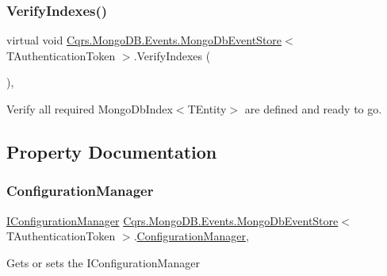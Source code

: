 \subsubsection{\texorpdfstring{Verify\+Indexes()}{VerifyIndexes()}}
{\footnotesize\ttfamily virtual void \hyperlink{classCqrs_1_1MongoDB_1_1Events_1_1MongoDbEventStore}{Cqrs.\+Mongo\+D\+B.\+Events.\+Mongo\+Db\+Event\+Store}$<$ T\+Authentication\+Token $>$.Verify\+Indexes (\begin{DoxyParamCaption}{ }\end{DoxyParamCaption})\hspace{0.3cm}{\ttfamily [protected]}, {\ttfamily [virtual]}}



Verify all required Mongo\+Db\+Index$<$\+T\+Entity$>$ are defined and ready to go. 



\subsection{Property Documentation}
\mbox{\label{classCqrs_1_1MongoDB_1_1Events_1_1MongoDbEventStore_a2944d6e589401531ba4283b984140c0e_a2944d6e589401531ba4283b984140c0e}} 
\subsubsection{\texorpdfstring{Configuration\+Manager}{ConfigurationManager}}
{\footnotesize\ttfamily \hyperlink{interfaceCqrs_1_1Configuration_1_1IConfigurationManager}{I\+Configuration\+Manager} \hyperlink{classCqrs_1_1MongoDB_1_1Events_1_1MongoDbEventStore}{Cqrs.\+Mongo\+D\+B.\+Events.\+Mongo\+Db\+Event\+Store}$<$ T\+Authentication\+Token $>$.\hyperlink{classCqrs_1_1Configuration_1_1ConfigurationManager}{Configuration\+Manager}\hspace{0.3cm}{\ttfamily [get]}, {\ttfamily [protected]}}



Gets or sets the I\+Configuration\+Manager 

